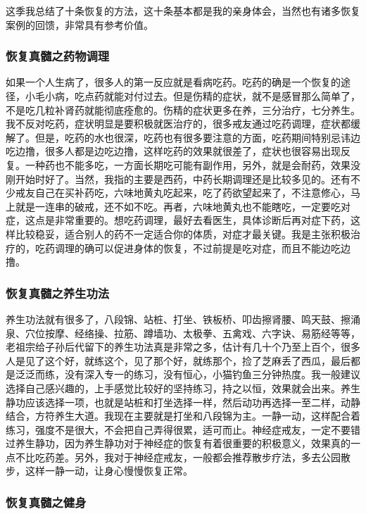 这季我总结了十条恢复的方法，这十条基本都是我的亲身体会，当然也有诸多恢复案例的回馈，非常具有参考价值。

\subsubsection{恢复真髓之药物调理}

如果一个人生病了，很多人的第一反应就是看病吃药。吃药的确是一个恢复的途径，小毛小病，吃点药就能对付过去。但是伤精的症状，就不是感冒那么简单了，不是吃几粒补肾药就能彻底痊愈的。伤精的症状更多在养，三分治疗，七分养生。我不反对吃药，症状明显是要积极就医治疗的，很多戒友通过吃药调理，症状都缓解了。但是，吃药的水也很深，吃药也有很多要注意的方面，吃药期间特别忌讳边吃边撸，很多人都是边吃边撸，这样吃药的效果就很差了，症状也很容易出现反复。一种药也不能多吃，一方面长期吃可能有副作用，另外，就是会耐药，效果没刚开始时好了。当然，我指的主要是西药，中药长期调理还是比较多见的。还有不少戒友自己在买补药吃，六味地黄丸吃起来，吃了药欲望起来了，不注意修心，马上就是一连串的破戒，还不如不吃。再者，六味地黄丸也不能瞎吃，一定要吃对症，这点是非常重要的。想吃药调理，最好去看医生，具体诊断后再对症下药，这样比较稳妥，适合别人的药不一定适合你的体质，对症才最关键。我是主张积极治疗的，吃药调理的确可以促进身体的恢复，不过前提是吃对症，而且不能边吃边撸。

\subsubsection{恢复真髓之养生功法}

养生功法就有很多了，八段锦、站桩、打坐、铁板桥、叩齿擦肾腰、鸣天鼓、擦涌泉、穴位按摩、经络操、拉筋、蹲墙功、太极拳、五禽戏、六字诀、易筋经等等，老祖宗给子孙后代留下的养生功法真是非常之多，估计有几十个乃至上百个，很多人是见了这个好，就练这个，见了那个好，就练那个，捡了芝麻丢了西瓜，最后都是泛泛而练，没有深入专一的练习，没有恒心，小猫钓鱼三分钟热度。我一般建议选择自己感兴趣的，上手感觉比较好的坚持练习，持之以恒，效果就会出来。养生静功应该选择一项，也就是站桩和打坐选择一样，然后动功再选择一至二样，动静结合，方符养生大道。我现在主要就是打坐和八段锦为主。一静一动，这样配合着练习，强度不是很大，不会把自己弄得很累，适可而止。神经症戒友，一定不要错过养生静功，因为养生静功对于神经症的恢复有着很重要的积极意义，效果真的一点不比吃药差。另外，我对于神经症戒友，一般都会推荐散步疗法，多去公园散步，这样一静一动，让身心慢慢恢复正常。

\subsubsection{恢复真髓之健身}

